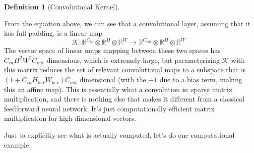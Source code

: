 \documentclass{article}
\theoremstyle{definition}
\theoremstyle{remark}
\theoremstyle{definition}
\newtheorem{definition}{Definition}[section]
\begin{document}
\begin{definition}[Convolutional Kernel]
\begin{enumerate}
    \end{enumerate}
    From the equation above, we can see that a convolutional layer, assuming that it has full padding, is a linear map  
    \begin{equation}
      \mathcal{K} : \mathbb{R}^{C_{in}} \otimes \mathbb{R}^H \otimes \mathbb{R}^W \rightarrow \mathbb{R}^{C_{out}} \otimes \mathbb{R}^H \otimes \mathbb{R}^W
      \label{eq:conv_mapping}
    \end{equation}
    The vector space of linear maps mapping between these two spaces has $C_{in} H^2 W^2 C_{out}$ dimensions, which is extremely large, but parameterizing $\mathcal{K}$ with this matrix reduces the set of relevant convolutional maps to a subspace that is $(1 + C_{in} H_{ker} W_{ker}) C_{out}$ dimensional (with the $+1$ due to a bias term, making this an affine map). This is essentially what a convolution is: sparse matrix multiplication, and there is nothing else that makes it different from a classical feedforward neural network. It's just computationally efficient matrix multiplication for high-dimensional vectors. 
    \end{definition}

    Just to explicitly see what is actually computed, let's do one computational example. 
\end{document}
